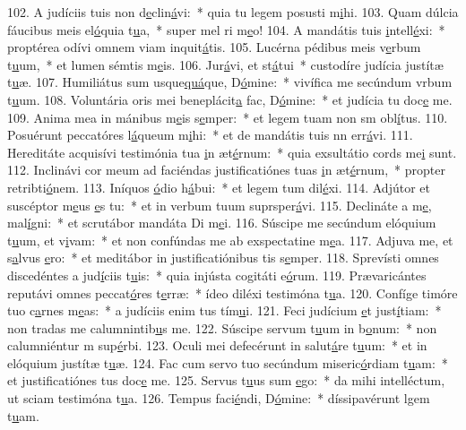 102. A judíciis tuis non d\uline{e}clin\uline{á}vi:~* quia tu legem posusti m\uline{i}hi.
103. Quam dúlcia fáucibus meis el\uline{ó}quia t\uline{u}a,~* super mel ri m\uline{e}o!
104. A mandátis tuis \uline{i}ntell\uline{é}xi:~* proptérea odívi omnem viam inquit\uline{á}tis.
105. Lucérna pédibus meis v\uline{e}rbum t\uline{u}um,~* et lumen sémtis m\uline{e}is.
106. Jur\uline{á}vi, et st\uline{á}tui~* custodíre judícia justítæ t\uline{u}æ.
107. Humiliátus sum usque\uline{quá}que, D\uline{ó}mine:~* vivífica me secúndum vrbum t\uline{u}um.
108. Voluntária oris mei beneplácit\uline{a} fac, D\uline{ó}mine:~* et judícia tu doc\uline{e} me.
109. Anima mea in mánibus m\uline{e}is s\uline{e}mper:~* et legem tuam non sm obl\uline{í}tus.
110. Posuérunt peccatóres l\uline{á}queum m\uline{i}hi:~* et de mandátis tuis nn err\uline{á}vi.
111. Hereditáte acquisívi testimónia tua \uline{i}n æt\uline{é}rnum:~* quia exsultátio cords me\uline{i} sunt.
112. Inclinávi cor meum ad faciéndas justificatiónes tuas \uline{i}n æt\uline{é}rnum,~* propter retribti\uline{ó}nem.
113. Iníquos \uline{ó}dio h\uline{á}bui:~* et legem tum dil\uline{é}xi.
114. Adjútor et suscéptor m\uline{e}us \uline{e}s tu:~* et in verbum tuum suprsper\uline{á}vi.
115. Declináte a m\uline{e}, mal\uline{í}gni:~* et scrutábor mandáta Di m\uline{e}i.
116. Súscipe me secúndum elóquium t\uline{u}um, et v\uline{i}vam:~* et non confúndas me ab exspectatine m\uline{e}a.
117. Adjuva me, et s\uline{a}lvus \uline{e}ro:~* et meditábor in justificatiónibus tis s\uline{e}mper.
118. Sprevísti omnes discedéntes a jud\uline{í}ciis t\uline{u}is:~* quia injústa cogitáti e\uline{ó}rum.
119. Prævaricántes reputávi omnes peccat\uline{ó}res t\uline{e}rræ:~* ídeo diléxi testimóna t\uline{u}a.
120. Confíge timóre tuo c\uline{a}rnes m\uline{e}as:~* a judíciis enim tus tím\uline{u}i.
121. Feci judícium \uline{e}t just\uline{í}tiam:~* non tradas me calumnintib\uline{u}s me.
122. Súscipe servum t\uline{u}um in b\uline{o}num:~* non calumniéntur m sup\uline{é}rbi.
123. Oculi mei defecérunt in salut\uline{á}re t\uline{u}um:~* et in elóquium justítæ t\uline{u}æ.
124. Fac cum servo tuo secúndum miseric\uline{ó}rdiam t\uline{u}am:~* et justificatiónes tus doc\uline{e} me.
125. Servus t\uline{u}us sum \uline{e}go:~* da mihi intelléctum, ut sciam testimóna t\uline{u}a.
126. Tempus faci\uline{é}ndi, D\uline{ó}mine:~* díssipavérunt lgem t\uline{u}am.
